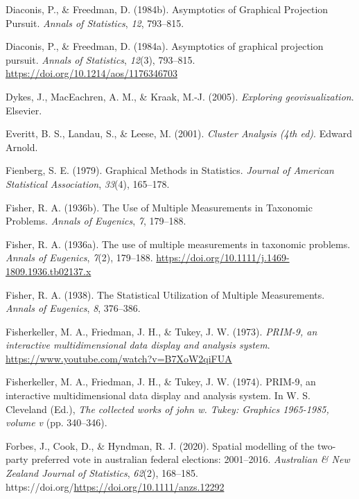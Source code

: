 \documentclass[
  letterpaper,
]{book}
\newlength{\cslhangindent}
\newlength{\cslentryspacingunit} %
\newenvironment{CSLReferences}[2] %
 {%
  \setlength{\parindent}{0pt}
  \ifodd #1
  \let\oldpar\par
  \def\par{\hangindent=\cslhangindent\oldpar}
  \fi
  \setlength{\parskip}{#2\cslentryspacingunit}
 }%
 {}
\begin{document}
\begin{CSLReferences}{1}{0}
\leavevmode{}%
Diaconis, P., \& Freedman, D. (1984b). {A}symptotics of {G}raphical
{P}rojection {P}ursuit. \emph{Annals of Statistics}, \emph{12},
793--815.

\leavevmode{}%
Diaconis, P., \& Freedman, D. (1984a). Asymptotics of graphical
projection pursuit. \emph{Annals of Statistics}, \emph{12}(3), 793--815.
\url{https://doi.org/10.1214/aos/1176346703}

\leavevmode{}%
Dykes, J., MacEachren, A. M., \& Kraak, M.-J. (2005). \emph{Exploring
geovisualization}. Elsevier.

\leavevmode{}%
Everitt, B. S., Landau, S., \& Leese, M. (2001). \emph{Cluster
{A}nalysis (4th ed)}. Edward Arnold.

\leavevmode{}%
Fienberg, S. E. (1979). Graphical {M}ethods in {S}tatistics.
\emph{Journal of American Statistical Association}, \emph{33}(4),
165--178.

\leavevmode{}%
Fisher, R. A. (1936b). The {U}se of {M}ultiple {M}easurements in
{T}axonomic {P}roblems. \emph{Annals of Eugenics}, \emph{7}, 179--188.

\leavevmode{}%
Fisher, R. A. (1936a). The use of multiple measurements in taxonomic
problems. \emph{Annals of Eugenics}, \emph{7}(2), 179--188.
\url{https://doi.org/10.1111/j.1469-1809.1936.tb02137.x}

\leavevmode{}%
Fisher, R. A. (1938). The {S}tatistical {U}tilization of {M}ultiple
{M}easurements. \emph{Annals of Eugenics}, \emph{8}, 376--386.

\leavevmode{}%
Fisherkeller, M. A., Friedman, J. H., \& Tukey, J. W. (1973).
\emph{{PRIM-9}, an interactive multidimensional data display and
analysis system}. \url{https://www.youtube.com/watch?v=B7XoW2qiFUA}

\leavevmode{}%
Fisherkeller, M. A., Friedman, J. H., \& Tukey, J. W. (1974). {PRIM-9},
an interactive multidimensional data display and analysis system. In W.
S. Cleveland (Ed.), \emph{The collected works of john w. Tukey: Graphics
1965-1985, volume v} (pp. 340--346).

\leavevmode{}%
Forbes, J., Cook, D., \& Hyndman, R. J. (2020). Spatial modelling of the
two-party preferred vote in australian federal elections: 2001--2016.
\emph{Australian \& New Zealand Journal of Statistics}, \emph{62}(2),
168--185. https://doi.org/\url{https://doi.org/10.1111/anzs.12292}


\end{CSLReferences}
\end{document}
